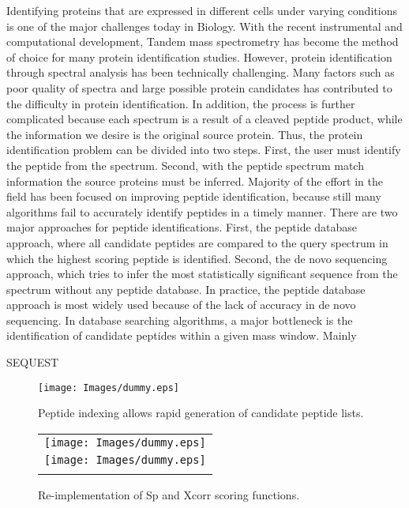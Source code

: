 \documentclass{bioinfo}
\begin{document}
Identifying proteins that are expressed in different cells under varying conditions is one of the major challenges today in Biology. With the recent instrumental and computational development, Tandem mass spectrometry has become the method of choice for many protein identification studies. However, protein identification through spectral analysis has been technically challenging. Many factors such as poor quality of spectra and large possible protein candidates has contributed to the difficulty in protein identification. In addition, the process is further complicated because each spectrum is a result of a cleaved peptide product, while the information we desire is the original source protein. Thus, the protein identification problem can be divided into two steps. First, the user must identify the peptide from the spectrum. Second, with the peptide spectrum match information the source proteins must be inferred. Majority of the effort in the field has been focused on improving peptide identification, because still many algorithms fail to accurately identify peptides in a timely manner.
	There are two major approaches for peptide identifications. First, the peptide database approach, where all candidate peptides are compared to the query spectrum in which the highest scoring peptide is identified. Second, the de novo sequencing approach, which tries to infer the most statistically significant sequence from the spectrum without any peptide database. In practice, the peptide database approach is most widely used because of the lack of accuracy in de novo sequencing. In database searching algorithms, a major bottleneck is the identification of candidate peptides within a given mass window. Mainly

SEQUEST\citep{eng:approach}


\begin{figure}
  \centering
  \texttt{[image: Images/dummy.eps]}
  \caption{Peptide indexing allows rapid generation of candidate peptide
  lists.}
  \label{figure:indexing}
\end{figure}

\begin{figure}
  \centering
  \begin{tabular}{c}
  \texttt{[image: Images/dummy.eps]} \\
  \texttt{[image: Images/dummy.eps]} \\
  \caption{Re-implementation of Sp and Xcorr scoring functions.}
  \label{figure:indexing}
  \end{tabular}
\end{figure}
\end{document}
